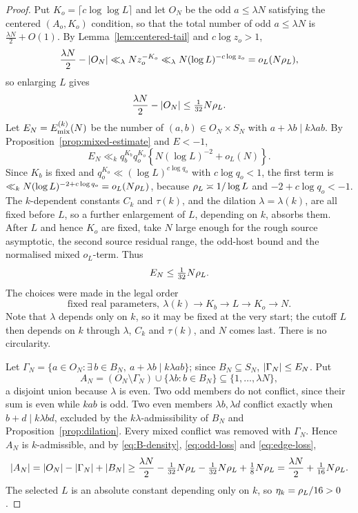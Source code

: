 \documentclass[11pt]{article}
\begin{document}
\begin{proof}
Put \(K_o=\lceil c\log\log L\rceil\) and let \(O_N\) be the odd
\(a\leq\lambda N\) satisfying the centered \((A_o,K_o)\) condition, so that
the total number of odd \(a\leq\lambda N\) is \(\frac{\lambda N}{2}+O(1)\). By
Lemma~\ref{lem:centered-tail} and \(c\log z_o>1\),
\[
 \frac{\lambda N}{2}-\left|O_N\right|\ll_\lambda Nz_o^{-K_o}
 \ll_\lambda N(\log L)^{-c\log z_o}=o_L(N\rho_L),
\]
so enlarging \(L\) gives
\begin{equation}\label{eq:odd-loss}
 \frac{\lambda N}{2}-\left|O_N\right|\leq\tfrac1{32}N\rho_L .
\end{equation}
Let \(E_N=E^{(k)}_{\rm mix}(N)\) be the number of \((a,b)\in O_N\times S_N\)
with \(a+\lambda b\mid k\lambda ab\). By Proposition~\ref{prop:mixed-estimate}
and \(E<-1\),
\[
 E_N\ll_kq_b^{K_b}q_o^{K_o}\left\{N(\log L)^{-2}+o_L(N)\right\}.
\]
Since \(K_b\) is fixed and \(q_o^{K_o}\ll(\log L)^{c\log q_o}\) with
\(c\log q_o<1\), the first term is
\(\ll_kN(\log L)^{-2+c\log q_o}=o_L(N\rho_L)\), because \(\rho_L\asymp1/\log L\)
and \(-2+c\log q_o<-1\). The \(k\)-dependent constants \(C_k\) and
\(\tau(k)\), and the dilation \(\lambda=\lambda(k)\), are all fixed before
\(L\), so a further enlargement of \(L\), depending on \(k\), absorbs them. After \(L\) and hence \(K_o\) are fixed,
take \(N\) large enough for the rough source asymptotic, the second source
residual range, the odd-host bound and the normalised mixed
\(o_L\)-term. Thus
\begin{equation}\label{eq:edge-loss}
 E_N\leq\tfrac1{32}N\rho_L .
\end{equation}
The choices were made in the legal order
\[
 \text{fixed real parameters},\ \lambda(k)
 \longrightarrow K_b\longrightarrow L
 \longrightarrow K_o\longrightarrow N .
\]
Note that \(\lambda\) depends only on \(k\), so it may be fixed at the very
start; the cutoff \(L\) then depends on \(k\) through \(\lambda\), \(C_k\) and
\(\tau(k)\), and \(N\) comes last. There is no circularity.

Let \(\Gamma_N=\{a\in O_N:\exists\,b\in B_N,\ a+\lambda b\mid k\lambda ab\}\);
since \(B_N\subseteq S_N\), \(\left|\Gamma_N\right|\leq E_N\). Put
\[
 A_N=(O_N\setminus\Gamma_N)\cup\{\lambda b:b\in B_N\}
 \subseteq\{1,\ldots,\lambda N\},
\]
a disjoint union because \(\lambda\) is even. Two odd members do not conflict,
since their sum is even while \(kab\) is odd. Two even members
\(\lambda b,\lambda d\) conflict exactly when \(b+d\mid k\lambda bd\), excluded
by the \(k\lambda\)-admissibility of \(B_N\) and
Proposition~\ref{prop:dilation}. Every mixed conflict was removed with
\(\Gamma_N\). Hence \(A_N\) is \(k\)-admissible, and by
\eqref{eq:B-density}, \eqref{eq:odd-loss} and \eqref{eq:edge-loss},
\[
 \left|A_N\right|=\left|O_N\right|-\left|\Gamma_N\right|+\left|B_N\right|
 \geq\frac{\lambda N}{2}-\tfrac1{32}N\rho_L-\tfrac1{32}N\rho_L
 +\tfrac18N\rho_L
 =\frac{\lambda N}{2}+\tfrac1{16}N\rho_L .
\]
The selected \(L\) is an absolute constant depending only on \(k\), so
\(\eta_k=\rho_L/16>0\).
\end{proof}
\end{document}
